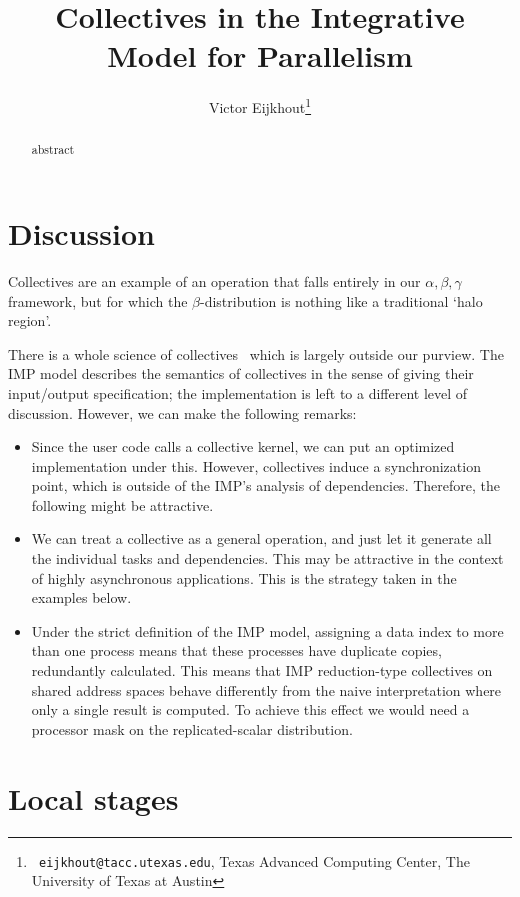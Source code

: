 \documentclass[11pt,fleqn,preprint]{impreport}
\title[Collectives in IMP]{Collectives in the Integrative Model for Parallelism}
\author[Eijkhout]{Victor Eijkhout\thanks{{\tt
      eijkhout@tacc.utexas.edu}, Texas Advanced Computing Center, The
    University of Texas at Austin}}
\begin{document}
\maketitle

\begin{abstract}
abstract
\end{abstract}

\section{Discussion}

Collectives are an example of an operation that falls entirely in our $\alpha,\beta,\gamma$
framework, but for which the $\beta$-distribution is nothing like a traditional `halo region'.

There is a whole science of collectives~\cite{Chan2007Collective} which is largely outside
our purview. The IMP model describes the semantics of collectives in the sense of giving
their input/output specification; the implementation is left to a different level of discussion.
However, we can make the following remarks:
\begin{itemize}
\item Since the user code calls a collective kernel, we can put an
  optimized implementation under this.  However, collectives induce a
  synchronization point, which is outside of the IMP's analysis of
  dependencies.  Therefore, the following might be attractive.
\item We can treat a collective as a general operation, and just let it generate
  all the individual tasks and dependencies. This may be attractive in the context
  of highly asynchronous applications. This is the strategy taken in the examples below.
\item Under the strict definition of the IMP model, assigning a data
  index to more than one process means that these processes have
  duplicate copies, redundantly calculated.  This means that IMP
  reduction-type collectives on shared address spaces behave
  differently from the naive interpretation where only a single result
  is computed.  To achieve this effect we would need a processor mask
  on the replicated-scalar distribution.
\end{itemize}

\section{Local stages}
\end{document}
